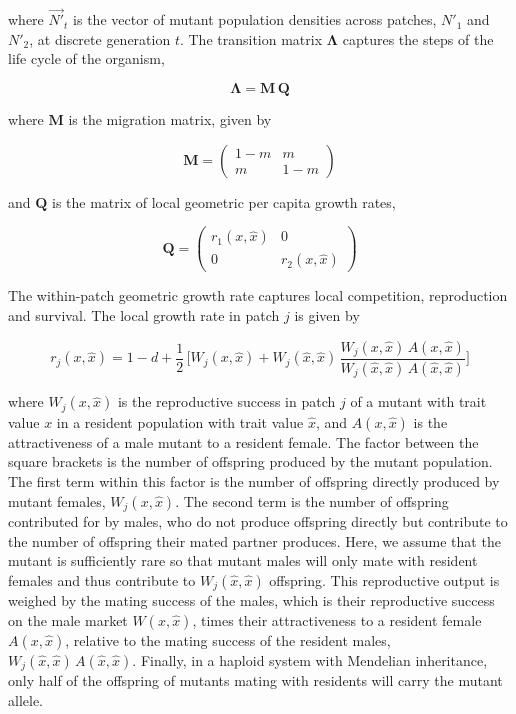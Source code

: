 where $\overrightarrow{N'}_t$ is the vector of mutant population densities across patches, $N'_1$ and $N'_2$, at discrete generation $t$. The transition matrix $\pmb{\Lambda}$ captures the steps of the life cycle of the organism,

\begin{equation}
    \pmb{\Lambda} = \pmb{M} \, \pmb{Q}
\end{equation}

where $\pmb{M}$ is the migration matrix, given by

\begin{equation}
    \pmb{M} =
    \begin{pmatrix}
        1-m & m \\
        m & 1-m 
    \end{pmatrix}
\end{equation}

and $\pmb{Q}$ is the matrix of local geometric per capita growth rates,

\begin{equation}
    \pmb{Q} =
    \begin{pmatrix}
        r_1(x, \hat{x}) & 0 \\
        0 & r_2(x, \hat{x})
    \end{pmatrix}
\end{equation}

The within-patch geometric growth rate captures local competition, reproduction and survival. The local growth rate in patch $j$ is given by

\begin{equation}
    r_j(x, \hat{x}) = 1 - d + \frac{1}{2} \, \Bigg[ W_j(x, \hat{x}) + W_j(\hat{x}, \hat{x}) \, \frac{W_j(x, \hat{x})\,A(x,\hat{x})}{W_j(\hat{x}, \hat{x})\,A(\hat{x},\hat{x})}\Bigg]
    \label{eq:growth_rate}
\end{equation}

where $W_j(x,\hat{x})$ is the reproductive success in patch $j$ of a mutant with trait value $x$ in a resident population with trait value $\hat{x}$, and $A(x, \hat{x})$ is the attractiveness of a male mutant to a resident female. The factor between the square brackets is the number of offspring produced by the mutant population. The first term within this factor is the number of offspring directly produced by mutant females, $W_j(x, \hat{x})$. The second term is the number of offspring contributed for by males, who do not produce offspring directly but contribute to the number of offspring their mated partner produces. Here, we assume that the mutant is sufficiently rare so that mutant males will only mate with resident females and thus contribute to $W_j(\hat x, \hat x)$ offspring. This reproductive output is weighed by the mating success of the males, which is their reproductive success on the male market $W(x, \hat{x})$, times their attractiveness to a resident female $A(x, \hat{x})$, relative to the mating success of the resident males, $W_j(\hat x, \hat x)\,A(\hat x, \hat x)$. Finally, in a haploid system with Mendelian inheritance, only half of the offspring of mutants mating with residents will carry the mutant allele.\\


